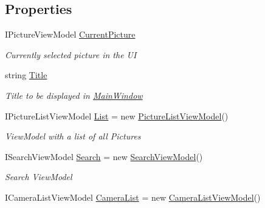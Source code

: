 \subsection*{Properties}
\begin{DoxyCompactItemize}
\item 
I\+Picture\+View\+Model \mbox{\hyperlink{class_pic_d_b_1_1_view_models_1_1_main_window_view_model_a9c4c52c2062c53ea3cf37be5fdb0842d}{Current\+Picture}}
\begin{DoxyCompactList}\small\item\em Currently selected picture in the UI \end{DoxyCompactList}\item 
string \mbox{\hyperlink{class_pic_d_b_1_1_view_models_1_1_main_window_view_model_a1d4dda65b12fb29886d0eab473b6912b}{Title}}
\begin{DoxyCompactList}\small\item\em Title to be displayed in \mbox{\hyperlink{class_pic_d_b_1_1_main_window}{Main\+Window}} \end{DoxyCompactList}\item 
I\+Picture\+List\+View\+Model \mbox{\hyperlink{class_pic_d_b_1_1_view_models_1_1_main_window_view_model_aa061a2f456ed8f7817d6cc2f42726a09}{List}} = new \mbox{\hyperlink{class_pic_d_b_1_1_view_models_1_1_picture_list_view_model}{Picture\+List\+View\+Model}}()
\begin{DoxyCompactList}\small\item\em View\+Model with a list of all Pictures \end{DoxyCompactList}\item 
I\+Search\+View\+Model \mbox{\hyperlink{class_pic_d_b_1_1_view_models_1_1_main_window_view_model_af2fd2181d3ef12acc499b32399d6cfee}{Search}} = new \mbox{\hyperlink{class_pic_d_b_1_1_view_models_1_1_search_view_model}{Search\+View\+Model}}()
\begin{DoxyCompactList}\small\item\em Search View\+Model \end{DoxyCompactList}\item 
I\+Camera\+List\+View\+Model \mbox{\hyperlink{class_pic_d_b_1_1_view_models_1_1_main_window_view_model_a6a267de19a02911ad75396c341a2b62a}{Camera\+List}} = new \mbox{\hyperlink{class_pic_d_b_1_1_view_models_1_1_camera_list_view_model}{Camera\+List\+View\+Model}}()

\end{DoxyCompactItemize}
